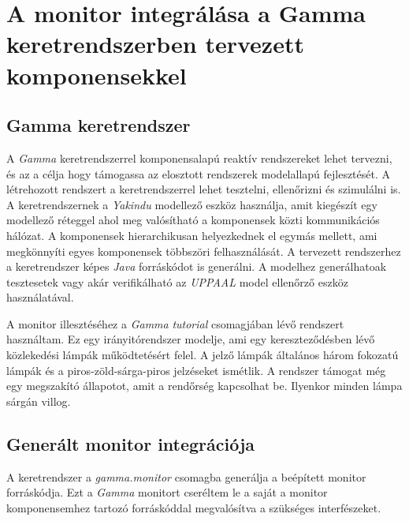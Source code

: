 \chapter{A monitor integrálása a Gamma keretrendszerben tervezett komponensekkel}

\section{Gamma keretrendszer}

A \textit{Gamma} keretrendszerrel komponensalapú reaktív rendszereket lehet tervezni, és az a célja hogy támogassa az elosztott rendszerek modelallapú fejlesztését.
A létrehozott rendszert a keretrendszerrel lehet tesztelni, ellenőrizni és szimulálni is.
A keretrendszernek a \textit{Yakindu} modellező eszköz használja, amit kiegészít egy modellező réteggel ahol meg valósítható a komponensek közti kommunikációs hálózat.
A komponensek hierarchikusan helyezkednek el egymás mellett, ami megkönnyíti egyes komponensek többszöri felhasználását.
A tervezett rendszerhez a keretrendszer képes \textit{Java} forráskódot is generálni.
A modelhez generálhatoak tesztesetek vagy akár verifikálható az \textit{UPPAAL} model ellenőrző eszköz használatával.

A monitor illesztéséhez a \textit{Gamma} \textit{tutorial} csomagjában lévő rendszert használtam.
Ez egy irányitórendszer modelje, ami egy kereszteződésben lévő közlekedési lámpák működtetésért felel.
A jelző lámpák általános három fokozatú lámpák és a piros-zöld-sárga-piros jelzéseket ismétlik.
A rendszer támogat még egy megszakító állapotot, amit a rendőrség kapcsolhat be.
Ilyenkor minden lámpa sárgán villog.

\clearpage\section{Generált monitor integrációja}

A keretrendszer a \textit{gamma.monitor} csomagba generálja a beépített monitor forráskódja.
Ezt a \textit{Gamma} monitort cseréltem le a saját a monitor komponensemhez tartozó forráskóddal megvalósítva a szükséges interfészeket.

